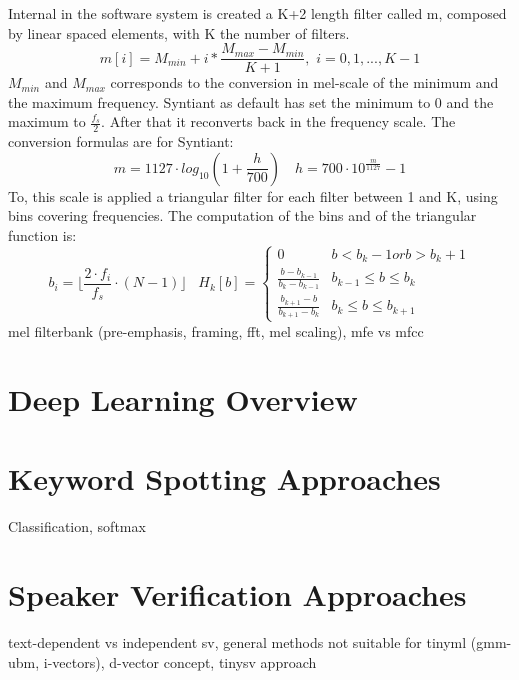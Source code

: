 Internal in the software system is created a K+2 length filter called m, composed by linear spaced elements, with K the number of filters.
\begin{equation}
    m[i]=M_{min}+i*\frac{M_{max}-M_{min}}{K+1},\,\,i=0,1,...,K-1
\end{equation}
$M_{min}$ and $M_{max}$ corresponds to the conversion in mel-scale of the minimum and the maximum frequency. Syntiant as default has set the minimum to 0 and the maximum to $\frac{f_s}{2}$. After that it reconverts back in the frequency scale. The conversion formulas are for Syntiant:
\begin{equation}
    m=1127\cdot log_{10}(1+\frac{h}{700})\,\,\,\,\,\,h=700\cdot 10^{\frac{m}{1127}}-1
\end{equation}
To, this scale is applied a triangular filter for each filter between 1 and K, using bins covering frequencies. The computation of the bins and of the triangular function is:
\begin{equation}
    b_i=\lfloor \frac{2\cdot f_i}{f_s}\cdot(N-1)\rfloor\,\,\,\,\,H_k[b]=
    \begin{cases}
        0 & b<b_k-1 or b>b_k+1\\
        \frac{b-b_{k-1}}{b_k-b_{k-1}} & b_{k-1}\leq b \leq b_k\\
        \frac{b_{k+1}-b}{b_{k+1}-b_k} & b_k \leq b \leq b_{k+1}
    \end{cases}
\end{equation}
mel filterbank (pre-emphasis, framing, fft, mel scaling), mfe vs mfcc\newline

\section{Deep Learning Overview}

\section{Keyword Spotting Approaches}
\label{sec:kws approaches}
Classification, softmax

\section{Speaker Verification Approaches}
\label{sec:sv approaches}
text-dependent vs independent sv, general methods not suitable for tinyml (gmm-ubm, i-vectors), d-vector concept, tinysv approach \newline

\newpage